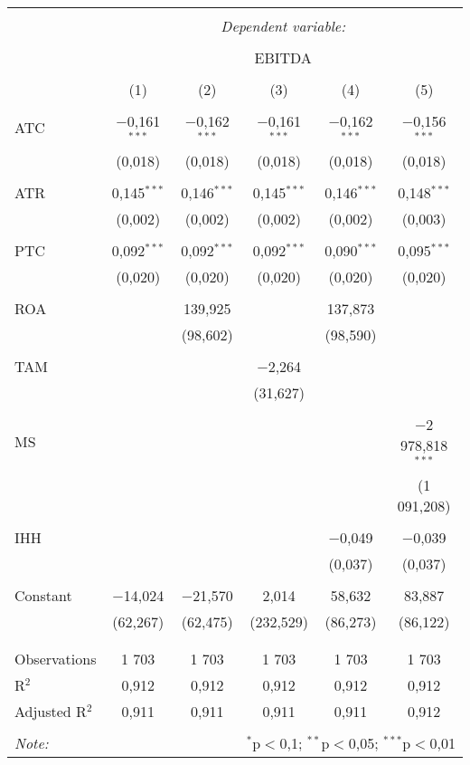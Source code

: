\documentclass[
]{article}
\begin{document}
\begin{table}[!htbp] \centering 
  \caption{} 
  \label{} 
\begin{tabular}{@{\extracolsep{5pt}}lccccc} 
\\[-1.8ex]\hline 
\hline \\[-1.8ex] 
 & \multicolumn{5}{c}{\textit{Dependent variable:}} \\ 
\cline{2-6} 
\\[-1.8ex] & \multicolumn{5}{c}{EBITDA} \\ 
\\[-1.8ex] & (1) & (2) & (3) & (4) & (5)\\ 
\hline \\[-1.8ex] 
 ATC & $-$0,161$^{***}$ & $-$0,162$^{***}$ & $-$0,161$^{***}$ & $-$0,162$^{***}$ & $-$0,156$^{***}$ \\ 
  & (0,018) & (0,018) & (0,018) & (0,018) & (0,018) \\ 
  & & & & & \\ 
 ATR & 0,145$^{***}$ & 0,146$^{***}$ & 0,145$^{***}$ & 0,146$^{***}$ & 0,148$^{***}$ \\ 
  & (0,002) & (0,002) & (0,002) & (0,002) & (0,003) \\ 
  & & & & & \\ 
 PTC & 0,092$^{***}$ & 0,092$^{***}$ & 0,092$^{***}$ & 0,090$^{***}$ & 0,095$^{***}$ \\ 
  & (0,020) & (0,020) & (0,020) & (0,020) & (0,020) \\ 
  & & & & & \\ 
 ROA &  & 139,925 &  & 137,873 &  \\ 
  &  & (98,602) &  & (98,590) &  \\ 
  & & & & & \\ 
 TAM &  &  & $-$2,264 &  &  \\ 
  &  &  & (31,627) &  &  \\ 
  & & & & & \\ 
 MS &  &  &  &  & $-$2 978,818$^{***}$ \\ 
  &  &  &  &  & (1 091,208) \\ 
  & & & & & \\ 
 IHH &  &  &  & $-$0,049 & $-$0,039 \\ 
  &  &  &  & (0,037) & (0,037) \\ 
  & & & & & \\ 
 Constant & $-$14,024 & $-$21,570 & 2,014 & 58,632 & 83,887 \\ 
  & (62,267) & (62,475) & (232,529) & (86,273) & (86,122) \\ 
  & & & & & \\ 
\hline \\[-1.8ex] 
Observations & 1 703 & 1 703 & 1 703 & 1 703 & 1 703 \\ 
R$^{2}$ & 0,912 & 0,912 & 0,912 & 0,912 & 0,912 \\ 
Adjusted R$^{2}$ & 0,911 & 0,911 & 0,911 & 0,911 & 0,912 \\ 
\hline 
\hline \\[-1.8ex] 
\textit{Note:}  & \multicolumn{5}{r}{$^{*}$p$<$0,1; $^{**}$p$<$0,05; $^{***}$p$<$0,01} \\ 
\end{tabular} 
\end{table}
\end{document}
